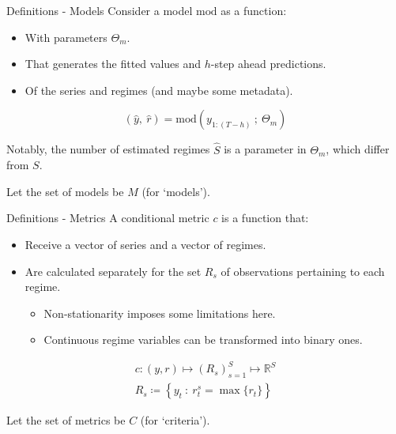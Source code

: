 \documentclass[
  ignorenonframetext,
]{beamer}
\providecommand{\tightlist}{%
  \setlength{\itemsep}{0pt}\setlength{\parskip}{0pt}}\usepackage{longtable,booktabs,array}
\renewcommand{\mod}{\text{mod}}
\begin{document}
\begin{frame}{Definitions - Models}
\label{definitions---models}
Consider a model \(\mod\) as a function:

\begin{itemize}
\tightlist
\item
  With parameters \(\Theta_m\).
\item
  That generates the fitted values and \(h\)-step ahead predictions.
\item
  Of the series and regimes (and maybe some metadata).
\end{itemize}

\begin{equation}
    (\hat{y},~ \hat{r}) = \mod(y_{1:(T-h)} ~;~ \Theta_m)
\end{equation}

Notably, the number of estimated regimes \(\hat{S}\) is a parameter in
\(\Theta_m\), which differ from \(S\).

Let the set of models be \(M\) (for `models').
\end{frame}

\begin{frame}{Definitions - Metrics}
\label{definitions---metrics}
A conditional metric \(c\) is a function that:

\begin{itemize}
\tightlist
\item
  Receive a vector of series and a vector of regimes.
\item
  Are calculated separately for the set \(R_s\) of observations
  pertaining to each regime.

  \begin{itemize}
  \tightlist
  \item
    Non-stationarity imposes some limitations here.
  \item
    Continuous regime variables can be transformed into binary ones.
  \end{itemize}
\end{itemize}

\begin{equation}
\begin{array}{l}
    c: (y, r) \mapsto (R_s)_{s = 1}^S \mapsto \mathbb{R}^{S} \\
    R_s \coloneqq \left\{ y_t ~:~ r^s_t = \max\{r_t\} \right\}
\end{array}
\end{equation}

Let the set of metrics be \(C\) (for `criteria').
\end{frame}
\end{document}
